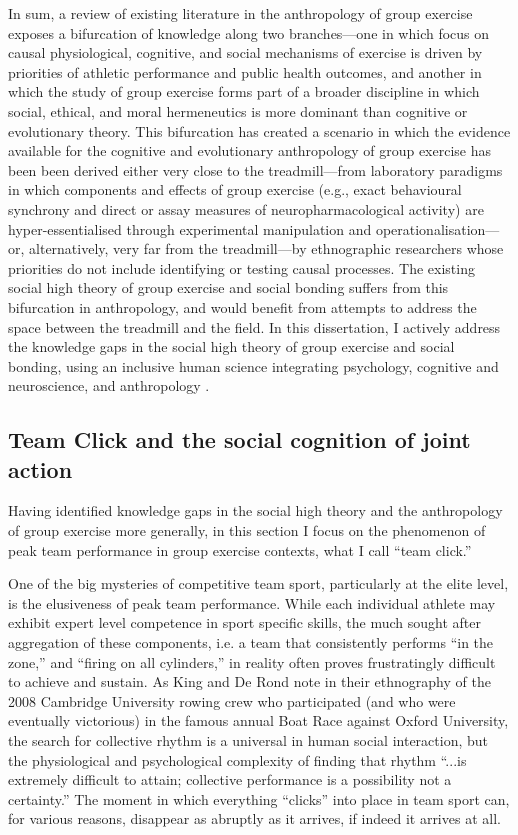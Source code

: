 \begin{CJK}{UTF8}{gbsn}
In sum, a review of existing literature in the anthropology of group exercise exposes a bifurcation of knowledge along two branches---one in which focus on causal physiological, cognitive, and social mechanisms of exercise is driven by priorities of athletic performance and public health outcomes, and another in which the study of group exercise forms part of a broader discipline in which social, ethical, and moral hermeneutics is more dominant than cognitive or evolutionary theory.  This bifurcation has created a scenario in which the evidence available for the cognitive and evolutionary anthropology of group exercise has been been derived either very close to the treadmill---from laboratory paradigms in which components and effects of group exercise (e.g., exact behavioural synchrony and direct or assay measures of neuropharmacological activity) are hyper-essentialised through experimental manipulation and operationalisation---or, alternatively, very far from the treadmill---by ethnographic researchers whose priorities do not include identifying or testing causal processes.  The existing social high theory of group exercise and social bonding suffers from this bifurcation in anthropology, and would benefit from attempts to address the space between the treadmill and the field.  In this dissertation, I actively address the knowledge gaps in the social high theory of group exercise and social bonding, using an inclusive human science integrating psychology, cognitive and neuroscience, and anthropology \citep{Whitehouse2012,Downey2014}.



\subsection{Team Click and the social cognition of joint action}

Having identified knowledge gaps in the social high theory and the anthropology of group exercise more generally, in this section I focus on the phenomenon of peak team performance in group exercise contexts, what I call ``team click.''

One of the big mysteries of competitive team sport, particularly at the elite level, is the elusiveness of peak team performance.  While each individual athlete may exhibit expert level competence in sport specific skills, the much sought after aggregation of these components, i.e. a team that consistently performs ``in the zone,'' and ``firing on all cylinders,'' in reality often proves frustratingly difficult to achieve and sustain.  As King and De Rond \textcite[568]{King2011} note in their ethnography of the 2008 Cambridge University rowing crew who participated (and who were eventually victorious) in the famous annual Boat Race against Oxford University, the search for collective rhythm is a universal in human social interaction, but  the physiological and psychological complexity of finding that rhythm ``...is extremely difficult to attain; collective performance is a possibility not a certainty.''   The moment in which everything ``clicks'' into place in team sport can, for various reasons, disappear as abruptly as it arrives, if indeed it arrives at all.


\end{CJK}
